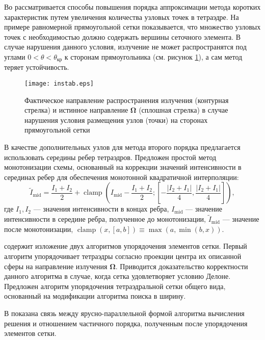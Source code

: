 Во  рассматривается способы повышения порядка аппроксимации метода коротких характеристик путем увеличения количества узловых точек в тетраэдре. На примере равномерной прямоугольной сетки показывается, что множество узловых точек с необходимостью должно содержать вершины сеточного элемента. В случае нарушения данного условия, излучение не может распространятся под углами $0 < \theta < \theta_\text{кр}$ к сторонам прямоугольника (см. рисунок \ref{fig:instab}), а сам метод теряет устойчивость.
\begin{figure}[ht!]
\centering
\texttt{[image: instab.eps]}
\caption{Фактическое направление распространения излучения (контурная стрелка) и истинное направление $\boldsymbol \Omega$ (сплошная стрелка) в случае нарушения условия размещения узлов (точки) на сторонах прямоугольной сетки}
\label{fig:instab}
\end{figure}

В качестве дополнительных узлов для метода второго порядка предлагается использовать середины ребер тетраэдров. Предложен простой метод монотонизации схемы, основанный на коррекции значений интенсивности в серединах ребер для обеспечения монотонной квадратичной интерполяции:
\[
\tilde I_\text{mid} = \frac{I_1 + I_2}{2} + \operatorname{clamp}\left(
I_\text{mid} - \frac{I_1 + I_2}{2}; \left[
- \frac{|I_2 + I_1|}{4}, \frac{|I_2 + I_1|}{4}
\right]
\right),
\]
где $I_1, I_2$ --- значения интенсивности в концах ребра, $I_\text{mid}$ --- значение интенсивности в середине ребра, полученное до монотонизации, $\tilde I_\text{mid}$ --- значение после монотонизации, $\operatorname{clamp}(x, [a, b]) \equiv \max(a, \min(b, x))$.

 содержит изложение двух алгоритмов упорядочения элементов сетки. Первый алгоритм упорядочивает тетраэдры согласно проекции центра их описанной сферы на направление излучения $\boldsymbol \Omega$. Приводится доказательство корректности данного алгоритма в случае, когда сетка удовлетворяет условию Делоне. Предложен алгоритм упорядочения тетраэдральной сетки общего вида, основанный на модификации алгоритма поиска в ширину.

В  показана связь между ярусно-параллельной формой алгоритма вычисления решения и отношением частичного порядка, полученным после упорядочения элементов сетки.


